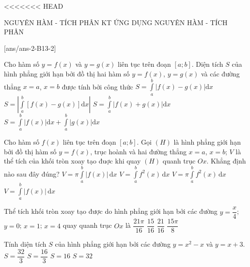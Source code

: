 <<<<<<< HEAD
\begin{name}
	{NGUYÊN HÀM - TÍCH PHÂN}
	{KT ỨNG DỤNG NGUYÊN HÀM - TÍCH PHÂN}
	{\tentruong}
	{\thoigian}
\end{name}
\setcounter{ex}{0}\setcounter{bt}{0}
[ans/ans-2-B13-2]
\caulc
\begin{ex}%
	Cho hàm số $y=f(x)$ và $y=g(x)$ liên tục trên đoạn $[a;b]$. Diện tích $S$ của hình phẳng giới hạn bởi đồ thị hai hàm số $y=f(x)$, $y=g(x)$ và các đường thẳng $x=a$, $x=b$ được tính bởi công thức	
	\choice
	{\True $\displaystyle S=\int\limits_a^b |f(x)-g(x)| \mathrm dx$}
	{$\displaystyle S= \left|\int\limits_a^b [f(x)-g(x)]\mathrm dx\right|$}
	{$\displaystyle S=\int\limits_a^b |f(x)+g(x)|\mathrm dx$}
	{$\displaystyle S=\int\limits_a^b |f(x)|\mathrm dx+\int\limits_a^b |g(x)|\mathrm dx$}
\end{ex}
\begin{ex}%
	Cho hàm số $ f(x)$ liên tục trên đoạn $ \left[a;b\right]$. Gọi $ (H)$ là hình phẳng giới hạn bởi đồ thị hàm số $ y=f(x)$, trục hoành và hai đường thẳng $ x=a$, $x=b$; $ V$ là thể tích của khối tròn xoay tạo đuợc khi quay $ (H)$ quanh trục $ Ox$. Khẳng định nào sau đây đúng?
	\choice
	{$ V=\pi \displaystyle\int\limits_{a}^{b} \left|f(x)\right|\mathrm{\,d}x$}
	{$ V=\displaystyle\int\limits_{a}^{b}f^2(x)\mathrm{\,d}x$}
	{\True $ V=\pi \displaystyle\int\limits_{a}^{b}f^2(x)\mathrm{\,d}x$}
	{$ V=\displaystyle\int\limits_{a}^{b}\left|f(x)\right|\mathrm{\,d}x$}
\end{ex} 
\begin{ex}%
	Thể tích khối tròn xoay tạo được do hình phẳng giới hạn bởi các đường $ y=\dfrac{x}{4}$; $y=0$; $x=1$; $x=4 $ quay quanh trục $ Ox $ là
	\choice
	{\True $ \dfrac{21\pi}{16} $}
	{$ \dfrac{15}{16} $}
	{$ \dfrac{21}{16} $}
	{$ \dfrac{15\pi}{8} $}
\end{ex}
\begin{ex}%
	Tính diện tích $S$ của hình phẳng giới hạn bởi các đường $y = x^2 - x$ và $y = x + 3$.
	\choice
	{\True $S = \dfrac{32}{3}$}
	{$S = \dfrac{16}{3}$}
	{$S = 16$}
	{$S = 32$}
\end{ex}
